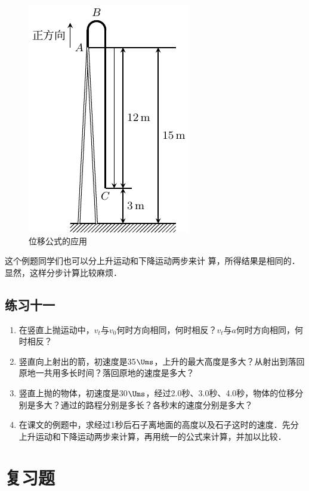 \begin{figure}[htp]
    \centering
    \includegraphics{fig/A/2-22.pdf}
    \caption{位移公式的应用}\label{fig_A_2-22}
\end{figure}


这个例题同学们也可以分上升运动和下降运动两步来计
算，所得结果是相同的．显然，这样分步计算比较麻烦．


\subsection*{练习十一}

\begin{enumerate}
	\item 在竖直上抛运动中，$v_t$与$v_0$何时方向相同，何时相反？$v_t$与$a$何时方向相同，何时相反？
\item 竖直向上射出的箭，初速度是35$\Ums$，上升的最大高度是多大？从射出到落回原地一共用多长时间？落回原地的速度是多大？
\item 竖直上抛的物体，初速度是30$\Ums$，经过2.0秒、3.0秒、4.0秒，物体的位移分别是多大？通过的路程分别是多长？各秒末的速度分别是多大？
\item 在课文的例题中，求经过1秒后石子离地面的高度以及石子这时的速度．先分上升运动和下降运动两步来计算，再用统一的公式来计算，并加以比较．
\end{enumerate}

\section*{复习题}

